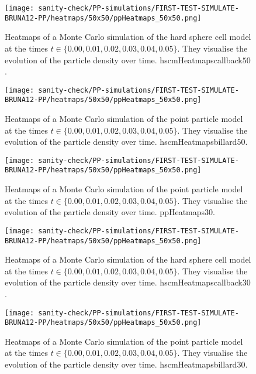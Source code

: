 \begin{figure}[h]
	\centering
    \texttt{[image: sanity-check/PP-simulations/FIRST-TEST-SIMULATE-BRUNA12-PP/heatmaps/50x50/ppHeatmaps\_50x50.png]}
    \caption{Heatmaps of a Monte Carlo simulation of the hard sphere cell model at the times $t \in \{0.00, 0.01, 0.02, 0.03, 0.04, 0.05\}$. 
    They visualise the evolution of the particle density over time. 
    hscmHeatmapscallback$50$.
    }
\end{figure}


\begin{figure}[h]
	\centering
    \texttt{[image: sanity-check/PP-simulations/FIRST-TEST-SIMULATE-BRUNA12-PP/heatmaps/50x50/ppHeatmaps\_50x50.png]}
    \caption{Heatmaps of a Monte Carlo simulation of the point particle model at the times $t \in \{0.00, 0.01, 0.02, 0.03, 0.04, 0.05\}$. 
    They visualise the evolution of the particle density over time. 
    hscmHeatmapsbillard$50$.
    }
\end{figure}




\begin{figure}[h]
	\centering
    \texttt{[image: sanity-check/PP-simulations/FIRST-TEST-SIMULATE-BRUNA12-PP/heatmaps/50x50/ppHeatmaps\_50x50.png]}
    \caption{Heatmaps of a Monte Carlo simulation of the point particle model at the times $t \in \{0.00, 0.01, 0.02, 0.03, 0.04, 0.05\}$. 
    They visualise the evolution of the particle density over time. 
    ppHeatmaps$30$. 
    }
\end{figure}

\begin{figure}[h]
	\centering
    \texttt{[image: sanity-check/PP-simulations/FIRST-TEST-SIMULATE-BRUNA12-PP/heatmaps/50x50/ppHeatmaps\_50x50.png]}
    \caption{Heatmaps of a Monte Carlo simulation of the hard sphere cell model at the times $t \in \{0.00, 0.01, 0.02, 0.03, 0.04, 0.05\}$. 
    They visualise the evolution of the particle density over time. 
    hscmHeatmapscallback$30$.
    }
\end{figure}


\begin{figure}[h]
	\centering
    \texttt{[image: sanity-check/PP-simulations/FIRST-TEST-SIMULATE-BRUNA12-PP/heatmaps/50x50/ppHeatmaps\_50x50.png]}
    \caption{Heatmaps of a Monte Carlo simulation of the point particle model at the times $t \in \{0.00, 0.01, 0.02, 0.03, 0.04, 0.05\}$. 
    They visualise the evolution of the particle density over time. 
    hscmHeatmapsbillard$30$.
    }
\end{figure}